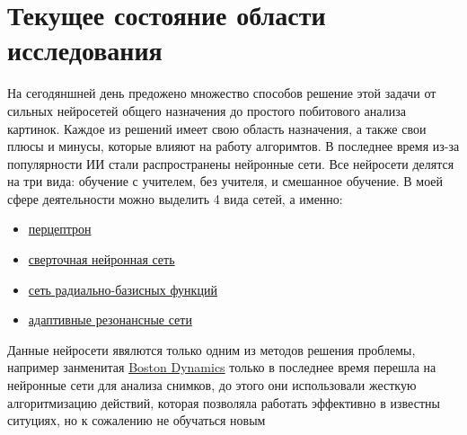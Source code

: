 \documentclass{article}
\begin{document}
\section{Текущее состояние области исследования}
    \qquad На сегодяншней день предожено множество способов решение этой задачи от сильных нейросетей общего назначения до простого побитового анализа картинок. Каждое из решений имеет свою область назначения, а также свои плюсы и минусы, которые влияют на работу алгоримтов. В последнее время из-за популярности ИИ стали распространены нейронные сети. Все нейросети делятся на три вида: обучение с учителем, без учителя, и смешанное обучение. В моей сфере деятельности можно выделить 4 вида сетей,  а именно:
    \begin{itemize}
    
        \item \textcolor{blue}{\href{https://en.wikipedia.org/wiki/Perceptron}{перцептрон}}
        \item \textcolor{blue}{\href{https://en.wikipedia.org/wiki/Convolutional_neural_network}{сверточная нейронная сеть}}
        \item \textcolor{blue}{\href{https://en.wikipedia.org/wiki/Radial_basis_function_network}{сеть радиально-базисных функций}}
        \item \textcolor{blue}{\href{ht tps://en.wikipedia.org/wiki/Adaptive_resonance_theory}{адаптивные резонансные сети}}
    \end{itemize}
    \par Данные нейросети явялются только одним из методов решения проблемы, например занменитая \textcolor{blue}{\href{https://en.wikipedia.org/wiki/Boston_Dynamics}{Boston Dynamics}} только в последнее время перешла на нейронные сети для анализа снимков, до этого они использовали жесткую алгоритмизацию действий, которая позволяла работать эффективно в известны ситуциях, но к сожалению не обучаться новым
    
 
\end{document}
